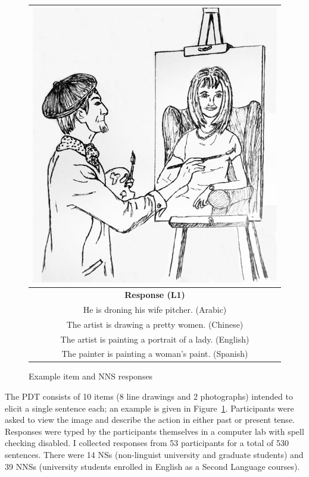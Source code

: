 \begin{figure}[htb!]
\begin{center}
\begin{tabular}{|c|}
\hline
\includegraphics[width=0.7\columnwidth]{figures/exampleprompt.jpg}\\
\hline
\textbf{Response (L1)} \\
\hline
He is droning his wife pitcher. (Arabic)\\
\hline
The artist is drawing a pretty women. (Chinese) \\
\hline
The artist is painting a portrait of a lady. (English) \\
\hline
The painter is painting a woman's paint. (Spanish)\\
\hline
\end{tabular}
\end{center}
\caption{Example item and NNS responses}
\label{fig:example-picture}
\end{figure}

The PDT consists of 10 items (8 line drawings and 2 photographs) intended to elicit a single sentence each; an example is given in Figure~\ref{fig:example-picture}. Participants
were asked to view the image and describe the action in either past or present tense. Responses were typed by the participants themselves in a computer lab with spell checking disabled.
I collected responses from 53 participants for a total of 530 sentences. There were 14 NSs (non-linguist university and graduate students) and 39 NNSs (university students enrolled in English as a Second Language courses).
